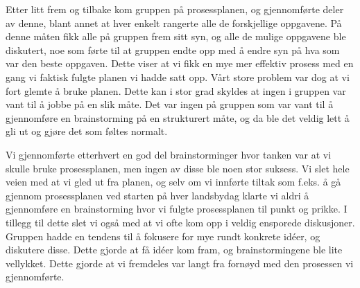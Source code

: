 Etter litt frem og tilbake kom gruppen på prosessplanen, og gjennomførte deler av denne, blant annet at hver enkelt rangerte alle de forskjellige oppgavene. På denne måten fikk alle på gruppen frem sitt syn, og alle de mulige oppgavene ble diskutert, noe som førte til at gruppen endte opp med å endre syn på hva som var den beste oppgaven. Dette viser at vi fikk en mye mer effektiv prosess med en gang vi faktisk fulgte planen vi hadde satt opp. Vårt store problem var dog at vi fort glemte å bruke planen. Dette kan i stor grad skyldes at ingen i gruppen var vant til å jobbe på en slik måte. Det var ingen på gruppen som var vant til å gjennomføre en brainstorming på en strukturert måte, og da ble det veldig lett å gli ut og gjøre det som føltes normalt.

Vi gjennomførte etterhvert en god del brainstorminger hvor tanken var at vi skulle bruke prosessplanen, men ingen av disse ble noen stor suksess. Vi slet hele veien med at vi gled ut fra planen, og selv om vi innførte tiltak som f.eks. å gå gjennom prosessplanen ved starten på hver landsbydag klarte vi aldri å gjennomføre en brainstorming hvor vi fulgte prosessplanen til punkt og prikke. I tillegg til dette slet vi også med at vi ofte kom opp i veldig ensporede diskusjoner. Gruppen hadde en tendens til å fokusere for mye rundt konkrete idéer, og diskutere disse. Dette gjorde at få idéer kom fram, og brainstormingene ble lite vellykket. Dette gjorde at vi fremdeles var langt fra fornøyd med den prosessen vi gjennomførte.

